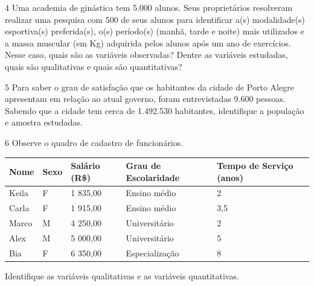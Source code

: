 
\num{4} Uma academia de ginástica tem 5.000 alunos. Seus proprietários
resolveram realizar uma pesquisa com 500 de seus alunos para identificar
a(s) modalidade(s) esportiva(s) preferida(s), o(s) período(s) (manhã,
tarde e noite) mais utilizados e a massa muscular (em Kg) adquirida
pelos alunos após um ano de exercícios. Nesse caso, quais são as
variáveis observadas? Dentre as variáveis estudadas, quais são
qualitativas e quais são quantitativas?



\num{5} Para saber o grau de satisfação que os habitantes da cidade
de Porto Alegre apresentam em relação ao atual governo, foram
entrevistadas 9.600 pessoas. Sabendo que a cidade tem cerca de 1.492.530
habitantes, identifique a população e amostra estudadas.



\num{6} Observe o quadro de cadastro de
funcionários.

\begin{longtable}[]{@{}lllll@{}}
\toprule
\textbf{Nome} & \textbf{Sexo} & \textbf{Salário (R\$)} & \textbf{Grau de
Escolaridade} & \textbf{Tempo de Serviço (anos)}\tabularnewline
\midrule
\endhead
Keila & F & 1 835,00 & Ensino médio & 2\tabularnewline
Carla & F & 1 915,00 & Ensino médio & 3,5\tabularnewline
Marco & M & 4 250,00 & Universitário & 2\tabularnewline
Alex & M & 5 000,00 & Universitário & 5\tabularnewline
Bia & F & 6 350,00 & Especialização & 8\tabularnewline
\bottomrule
\end{longtable}

Identifique as variáveis qualitativas e as variáveis quantitativas.



